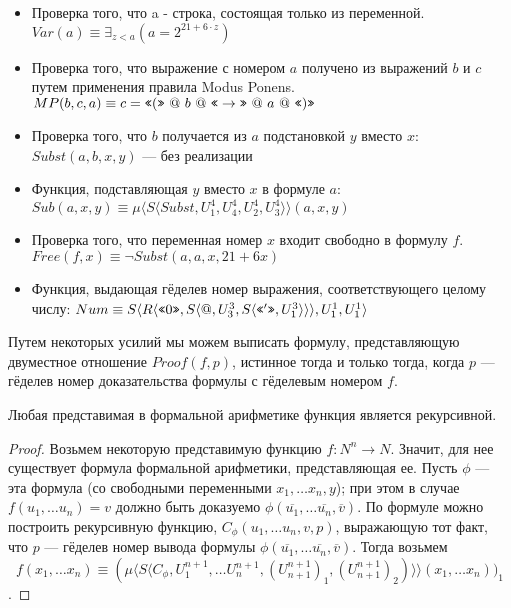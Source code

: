 \begin{itemize}
\item Проверка того, что a - строка, состоящая только из переменной.
$Var(a) \equiv \exists_{z < a} (a = 2 ^ {21 + 6\cdot z})$

\item Проверка того, что выражение с номером $a$ получено из выражений $b$ и $c$ 
путем применения правила Modus Ponens.
$MP (b,c,a) \equiv c = \texttt{<<}(\texttt{>>} ~@~ b ~@~ \texttt{<<}\rightarrow\texttt{>>} ~@~ a ~@~ \texttt{<<})\texttt{>>}$

\item Проверка того, что $b$ получается из $a$ подстановкой $y$ вместо $x$:
$Subst (a,b,x,y)$ --- без реализации

\item Функция, подставляющая $y$ вместо $x$ в формуле $a$:\\
$Sub (a,x,y) \equiv \mu \langle{}S\langle{}Subst,U^4_1,U^4_4,U^4_2,U^4_3\rangle\rangle(a,x,y)$

\item Проверка того, что переменная номер $x$ входит свободно в формулу $f$.\\
$Free (f,x) \equiv \neg Subst(a,a,x,21 + 6x)$

\item Функция, выдающая гёделев номер выражения, соответствующего целому числу:
$Num \equiv S\langle{}R\langle{}\texttt{<<}0\texttt{>>},S\langle{}@,U^3_3,S\langle{}\texttt{<<}'\texttt{>>},U^3_1\rangle{}\rangle{}\rangle,U^1_1,U^1_1\rangle{}$

\end{itemize}

Путем некоторых усилий мы можем выписать формулу, представляющую
двуместное отношение $Proof(f,p)$, истинное тогда и только тогда, когда
$p$ --- гёделев номер доказательства формулы с гёделевым номером $f$.

\begin{theorem}
Любая представимая в формальной арифметике функция является рекурсивной.
\end{theorem}
\begin{proof}
Возьмем некоторую представимую функцию $f: N^n \rightarrow N$. Значит, для нее существует
формула формальной арифметики, представляющая ее. Пусть $\phi$ --- эта формула
(со свободными переменными $x_1, \dots x_n, y$); при этом в случае 
$f(u_1, \dots u_n) = v$ должно быть доказуемо $\phi(\overline{u_1}, \dots \overline{u_n}, \overline{v})$.
По формуле можно построить рекурсивную функцию, $C_\phi (u_1, \dots u_n, v, p)$, 
выражающую тот факт, что $p$ --- гёделев номер вывода формулы 
$\phi(\overline{u_1}, \dots \overline{u_n}, \overline{v})$. Тогда 
возьмем $$f (x_1, \dots x_n) \equiv (\mu \langle{}S\langle{}C_\phi,U^{n+1}_1,\dots U^{n+1}_n,(U^{n+1}_{n+1})_1, (U^{n+1}_{n+1})_2)\rangle\rangle (x_1, \dots x_n))_1$$.
\end{proof}
